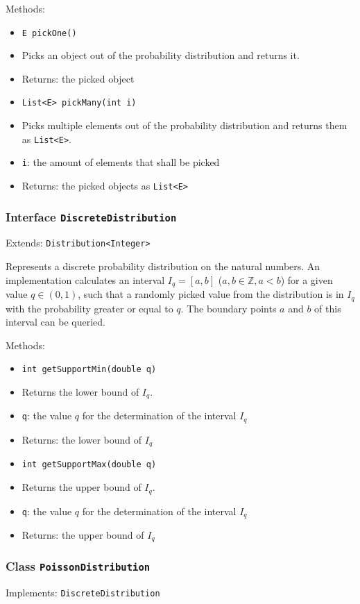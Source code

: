 \documentclass[parskip=full,11pt]{scrartcl}
\begin{document}
Methods:
\begin{itemize}\itemsep -10pt
\item \texttt{E pickOne()}
\item[] Picks an object out of the probability distribution and returns it.
\item[] Returns: the picked object

\item \texttt{List<E> pickMany(int i)}
\item[] Picks multiple elements out of the probability distribution and returns them as \texttt{List<E>}.
\item[] \texttt{i}: the amount of elements that shall be picked
\item[] Returns: the picked objects as \texttt{List<E>}
\end{itemize}
\newpage
\subsubsection{Interface \texttt{DiscreteDistribution}}
Extends: \texttt{Distribution<Integer>}

Represents a discrete probability distribution on the natural numbers. An implementation calculates an interval \(I_q = [a, b]\) (\(a, b \in \mathbb{Z}, a < b\)) for a given value \(q \in (0,1)\), such that a randomly picked value from the distribution is in \(I_q\) with the probability greater or equal to \(q \). The boundary points \(a\) and \(b\) of this interval can be queried.

Methods:
\begin{itemize}\itemsep -10pt
\item \texttt{int getSupportMin(double q)}
\item[] Returns the lower bound of \(I_q\).
\item[] \texttt{q}: the value \(q\) for the determination of the interval \(I_q\)
\item[] Returns: the lower bound of \(I_q\)

\item \texttt{int getSupportMax(double q)}
\item[] Returns the upper bound of \(I_q\).
\item[] \texttt{q}: the value \(q\) for the determination of the interval \(I_q\)
\item[] Returns: the upper bound of \(I_q\)
\end{itemize}

\subsubsection{Class \texttt{PoissonDistribution}}
Implements: \texttt{DiscreteDistribution}
\end{document}
